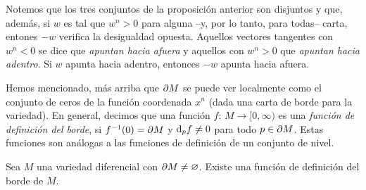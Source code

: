 Notemos que los tres conjuntos de la proposici\'{o}n anterior son disjuntos
y que, adem\'{a}s, si $w$ es tal que $w^{n}>0$ para alguna --y, por lo
tanto, para todas-- carta, entones $-w$ verifica la desigualdad opuesta.
Aquellos vectores tangentes con $w^{n}<0$ se dice que \emph{apuntan hacia %
afuera} y aquellos con $w^{n}>0$ que \emph{apuntan hacia adentro}. Si
$w$ apunta hacia adentro, entonces $-w$ apunta hacia afuera.

Hemos mencionado, m\'{a}s arriba que $\borde[M]$ se puede ver localmente
como el conjunto de ceros de la funci\'{o}n coordenada $x^{n}$ (dada una
carta de borde para la variedad). En general, decimos que una funci\'{o}n
$f:\,M\rightarrow [0,\infty)$ es una \emph{funci\'{o}n de definici\'{o}n %
del borde}, si $f^{-1}(0)=\borde[M]$ y $\diferencial[p]{f}\not=0$ para
todo $p\in\borde[M]$. Estas funciones son an\'{a}logas a las funciones de
definici\'{o}n de un conjunto de nivel.

\begin{propoBordeDeNivel}\label{thm:bordedenivel}
	Sea $M$ una variedad diferencial con $\borde[M]\not =\varnothing$.
	Existe una funci\'{o}n de definici\'{o}n del borde de $M$.
\end{propoBordeDeNivel}

